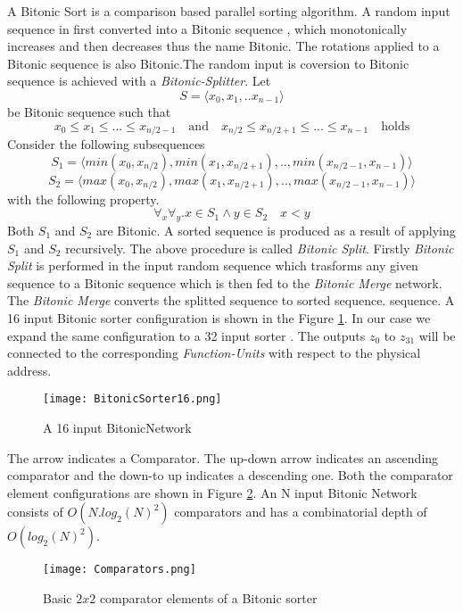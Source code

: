 			    A Bitonic Sort\cite{bitonic_ref} is a comparison based parallel sorting algorithm. A random input sequence in first converted into a Bitonic sequence , which monotonically increases and then decreases thus the name Bitonic.
			    The rotations applied to a Bitonic sequence is also Bitonic.The random input is coversion to Bitonic sequence is achieved with a \textit{Bitonic-Splitter}.\newline
			    Let \[ 
				  S = \langle x_0,x_1,..x_{n-1}\rangle 
				\] be Bitonic sequence such that
				\[
				    x_0 \leq x_1 \leq ... \leq x_{n/2-1} \quad \textrm{and} \quad  x_{n/2} \leq x_{n/2+1} \leq ... \leq x_{n-1}  \quad \textrm{holds}
				\]
			    Consider the following subsequences
				\[
				  S_{1} =  \langle min(x_0,x_{n/2}), min(x_1,x_{n/2+1}),..,min(x_{n/2-1},x_{n-1})\rangle
				\]
				\[
				  S_{2} =  \langle max(x_0,x_{n/2}), max(x_1,x_{n/2+1}),..,max(x_{n/2-1},x_{n-1})\rangle
				\]
			    with the following property.
				\[
				  \forall _{x} \forall _{y}. x \in S_{1}  \wedge  y \in S_{2} \quad x < y
				\]
			    Both $S_{1}$ and $S_{2}$ are Bitonic. A sorted sequence is produced as a result of applying $S_{1}$ and $S_{2}$ recursively. The above procedure is called \textit{Bitonic Split}. Firstly \textit{Bitonic Split} is performed 
			    in the input random sequence which trasforms any given sequence to a Bitonic sequence which is then fed to the \textit{Bitonic Merge} network. The \textit{Bitonic Merge} converts the splitted sequence to sorted sequence.
			    sequence. A 16 input Bitonic sorter configuration is shown in the Figure \ref{fig:BitonicSorter16}. In our case we expand the same configuration to a 32 input sorter . The outputs $z_{0}$ to $z_{31}$  will
			    be connected to the corresponding \textit{Function-Units} with respect to the physical address.
				    \begin{figure}[!ht]
					      \texttt{[image: BitonicSorter16.png]}
					    \caption{A 16 input BitonicNetwork}
				    \label{fig:BitonicSorter16}
				    \end{figure}
			    The arrow indicates a Comparator. The up-down arrow indicates an ascending comparator and the down-to up indicates a descending one. Both the comparator element configurations are shown in Figure \ref{fig:Comparators}. 
			    An N input Bitonic Network consists of $O(N.log_{2}(N)^{2})$ comparators and has a combinatorial depth of $O(log_{2}(N)^{2})$.
				    \begin{figure}[!ht]
					      \texttt{[image: Comparators.png]}
					    \caption{Basic $2 x 2$ comparator elements of a Bitonic sorter}
				    \label{fig:Comparators}
				    \end{figure}
